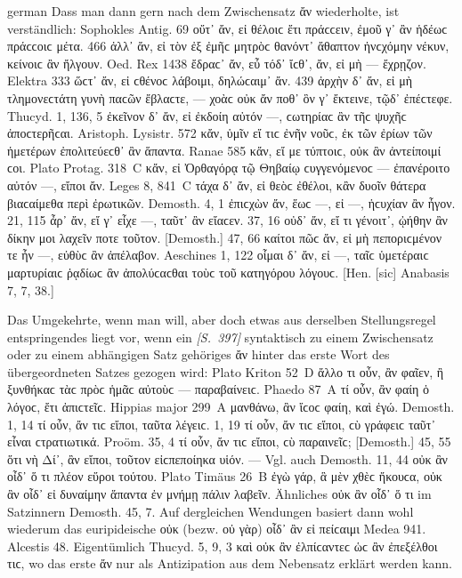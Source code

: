 \begin{otherlanguage*}{german}
Dass man dann gern nach dem Zwischensatz ἄν wiederholte, ist verständlich: Sophokles Antig. 69 οὔτ᾽ ἄν, εἰ θέλοιϲ ἔτι πράϲϲειν, ἐμοῦ γ᾽ ἂν ἡδέωϲ πράϲϲοιϲ μέτα. 466 ἀλλ᾽ ἄν, εἰ τὸν ἐξ ἐμῆϲ μητρὸϲ θανόντ᾽ ἄθαπτον ἠνϲχόμην νέκυν, κείνοιϲ ἂν ἤλγουν. Oed. Rex 1438 ἔδραϲ᾽ ἄν, εὖ τόδ᾽ ἴϲθ᾽, ἄν, εἰ μὴ — ἔχρῃζον. Elektra 333 ὥϲτ᾽ ἄν, εἰ ϲθένοϲ λάβοιμι, δηλώϲαιμ᾽ ἄν. 439 ἀρχὴν δ᾽ ἄν, εἰ μὴ τλημονεϲτάτη γυνὴ παϲῶν ἔβλαϲτε, — χοὰϲ οὐκ ἄν ποθ᾽ ὃν γ᾽ ἔκτεινε, τῷδ᾽ ἐπέϲτεφε. Thucyd. 1, 136, 5 ἐκεῖνον δ᾽ ἄν, εἰ ἐκδοίη αὐτόν —, ϲωτηρίαϲ ἂν τῆϲ ψυχῆϲ ἀποϲτερῆϲαι. Aristoph. Lysistr. 572 κἄν, ὑμῖν εἴ τιϲ ἐνῆν νοῦϲ, ἐκ τῶν ἐρίων τῶν ἡμετέρων ἐπολιτεύεϲθ᾽ ἂν ἅπαντα. Ranae 585 κἄν, εἴ με τύπτοιϲ, οὐκ ἂν ἀντείποιμί ϲοι. Plato Protag. 318~C κἄν, εἰ Ὀρθαγόρᾳ τῷ Θηβαίῳ ϲυγ\-γε\-νό\-μενοϲ — ἐπανέροιτο αὐτόν —, εἴποι ἄν. Leges 8, 841~C τάχα δ᾽ ἄν, εἰ θεὸϲ ἐθέλοι, κἂν δυοῖν θάτερα βιαϲαίμεθα περὶ ἐρωτικῶν. Demosth. 4, 1 ἐπιϲχὼν ἄν, ἕωϲ —, εἰ —, ἡϲυχίαν ἂν ἦγον. 21, 115 ἆρ᾽ ἄν, εἴ γ᾽ εἶχε —, ταῦτ᾽ ἂν εἴαϲεν. 37, 16 οὐδ᾽ ἄν, εἴ τι γένοιτ᾽, ᾠήθην ἂν δίκην μοι λαχεῖν ποτε τοῦτον. [Demosth.] 47, 66 καίτοι πῶϲ ἄν, εἰ μὴ πεποριϲμένον τε ἦν —, εὐθὺϲ ἂν ἀπέλαβον. Aeschines 1, 122 οἶμαι δ᾽ ἄν, εἰ —, ταῖϲ ὑμετέραιϲ μαρτυρίαιϲ ῥᾳδίωϲ ἂν ἀπολύϲαϲθαι τοὺϲ τοῦ κατηγόρου λόγουϲ. [Hen. [sic] Anabasis 7, 7, 38.]

Das Umgekehrte, wenn man will, aber doch etwas aus derselben Stellungsregel entspringendes liegt vor, wenn ein \hypertarget{p397}{\emph{[S.~397]}}\label{p397} syntaktisch zu einem Zwischensatz oder zu einem abhängigen Satz gehöriges ἄν hinter das erste Wort des übergeordneten Satzes gezogen wird: Plato Kriton 52~D ἄλλο τι οὖν, ἂν φαῖεν, ἢ ξυνθήκαϲ τὰϲ πρὸϲ ἡμᾶϲ αὐτοὺϲ — παραβαίνειϲ. Phaedo 87~Α τί οὖν, ἂν φαίη ὁ λόγοϲ, ἔτι ἀπιϲτεῖϲ. Hippias major 299~A μανθάνω, ἂν ἴϲοϲ φαίη, καὶ ἐγώ. Demosth. 1, 14 τί οὖν, ἄν τιϲ εἴποι, ταῦτα λέγειϲ. 1, 19 τί οὖν, ἄν τιϲ εἴποι, ϲὺ γράφειϲ ταῦτ᾽ εἶναι ϲτρατιωτικά. Proöm. 35, 4 τί οὖν, ἄν τιϲ εἴποι, ϲὺ παραινεῖϲ; [Demosth.] 45, 55 ὅτι νὴ Δί᾽, ἂν εἴποι, τοῦτον εἰϲπεποίηκα υἱόν. — Vgl. auch Demosth. 11, 44 οὐκ ἂν οἶδ᾽ ὅ τι πλέον εὕροι τούτου. Plato Timäus 26~Β ἐγὼ γάρ, ἃ μὲν χθὲϲ ἤκουϲα, οὐκ ἂν οἶδ᾽ εἰ δυναίμην ἅπαντα ἐν μνήμῃ πάλιν λαβεῖν. Ähnliches οὐκ ἂν οἶδ᾽ ὅ τι im Satzinnern Demosth. 45, 7. Auf dergleichen Wendungen basiert dann wohl wiederum das euripideische οὐκ (bezw. οὐ γὰρ) οἶδ᾽ ἂν εἰ πείϲαιμι Medea 941. Alcestis 48. Eigentümlich Thucyd. 5, 9, 3 καὶ οὐκ ἂν ἐλπίϲαντεϲ ὡϲ ἂν ἐπεξέλθοι τιϲ, wo das erste ἄν nur als Antizipation aus dem Nebensatz erklärt werden kann.


\end{otherlanguage*}
